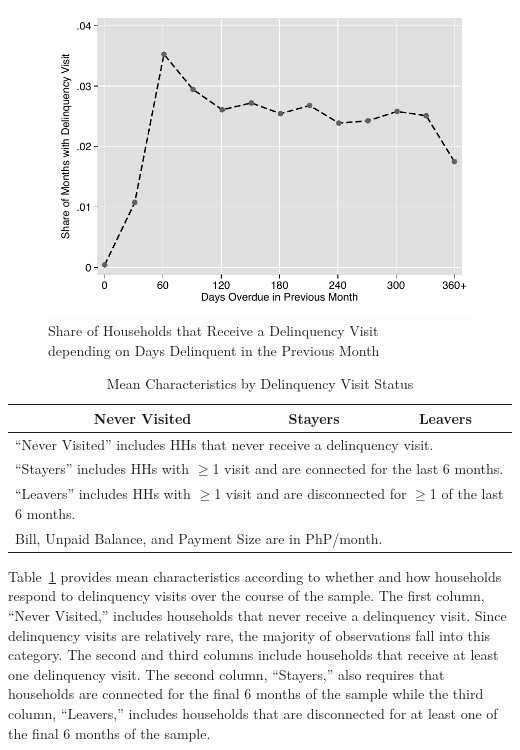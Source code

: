 \documentclass[12pt]{article}
\begin{document}
\begin{figure}
\centering
\caption{Share of Households that Receive a Delinquency Visit \\ depending on Days Delinquent in the Previous Month}\label{figure:dc_hazard}
\includegraphics[scale=.7]{tables/connected_visit_hazard_all.pdf}
\end{figure}

\begin{table}[h!]
\centering
\caption{Mean Characteristics by Delinquency Visit Status}\label{table:descriptives_3g}
\vspace{-2mm}
\begin{tabular}{l*{1}{ccc}}
\toprule
 & Never Visited & Stayers & Leavers  \\
\midrule

\bottomrule
\multicolumn{4}{l}{\scriptsize ``Never Visited'' includes HHs that never receive a delinquency visit.}\\  [-.5em]
\multicolumn{4}{l}{\scriptsize ``Stayers'' includes HHs with $\geq$1 visit and are connected for the last 6 months.}\\ [-.5em]
\multicolumn{4}{l}{\scriptsize ``Leavers'' includes HHs with $\geq$1 visit and are disconnected for $\geq$1 of the last 6 months.}\\ [-.5em]
\multicolumn{4}{l}{\scriptsize Bill, Unpaid Balance, and Payment Size are in PhP/month.} 
\end{tabular}
\end{table}

Table~\ref{table:descriptives_3g} provides mean characteristics according to whether and how households respond to delinquency visits over the course of the sample.  The first column, ``Never Visited,'' includes households that never receive a delinquency visit.  Since delinquency visits are relatively rare, the majority of observations fall into this category.  The second and third columns include households that receive at least one delinquency visit.   The second column, ``Stayers,'' also requires that households are connected for the final 6 months of the sample while the third column, ``Leavers,'' includes households that are disconnected for at least one of the final 6 months of the sample.  
\end{document}
